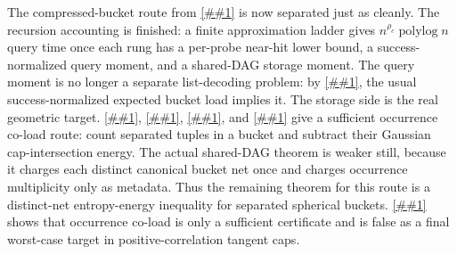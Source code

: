 \documentclass[10pt]{article}
\newcommand{\cref}[1]{\ref{##1}}
\newcommand{\Cref}[1]{\ref{##1}}
\theoremstyle{definition}
\newcommand{\polylog}{\operatorname{polylog}}
\begin{document}
The compressed-bucket route from \cref{prop:success-normalized-bucket-dag} is
now separated just as cleanly.  The recursion accounting is finished: a finite
approximation ladder gives \(n^{\rho_c}\polylog n\) query time once each rung
has a per-probe near-hit lower bound, a success-normalized query moment, and a
shared-DAG storage moment.  The query moment is no longer a separate
list-decoding problem: by \cref{lem:first-moment-query-compression}, the usual
success-normalized expected bucket load implies it.  The storage side is the
real geometric target.  \Cref{lem:occurrence-moments-dominate-dag},
\cref{lem:packing-list-tuple-moment},
\cref{lem:gaussian-cap-intersection-energy}, and
\cref{cor:tuple-profile-renyi-certificate} give a sufficient occurrence
co-load route: count separated tuples in a bucket and subtract their Gaussian
cap-intersection energy.  The actual shared-DAG theorem is weaker still,
because it charges each distinct canonical bucket net once and charges
occurrence multiplicity only as metadata.  Thus the remaining theorem for this
route is a distinct-net entropy-energy inequality for separated spherical
buckets.  \Cref{lem:positive-correlation-occurrence-obstruction} shows that
occurrence co-load is only a sufficient certificate and is false as a final
worst-case target in positive-correlation tangent caps.
\end{document}
